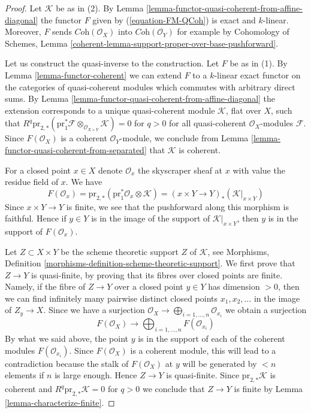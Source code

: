 \begin{proof}
Let $\mathcal{K}$ be as in (2). By
Lemma \ref{lemma-functor-quasi-coherent-from-affine-diagonal}
the functor $F$ given by (\ref{equation-FM-QCoh}) is exact and $k$-linear.
Moreover, $F$ sends $\textit{Coh}(\mathcal{O}_X)$ into
$\textit{Coh}(\mathcal{O}_Y)$ for example by
Cohomology of Schemes, Lemma
\ref{coherent-lemma-support-proper-over-base-pushforward}.

\medskip\noindent
Let us construct the quasi-inverse to the construction. Let $F$ be
as in (1). By Lemma \ref{lemma-functor-coherent} we can extend $F$
to a $k$-linear exact functor on the
categories of quasi-coherent modules which commutes with arbitrary direct sums.
By Lemma \ref{lemma-functor-quasi-coherent-from-affine-diagonal}
the extension corresponds to a unique quasi-coherent module
$\mathcal{K}$, flat over $X$, such that
$R^q\text{pr}_{2, *}(\text{pr}_1^*\mathcal{F}
\otimes_{\mathcal{O}_{X \times Y}} \mathcal{K}) = 0$ for $q > 0$
for all quasi-coherent $\mathcal{O}_X$-modules $\mathcal{F}$.
Since $F(\mathcal{O}_X)$ is a coherent $\mathcal{O}_Y$-module, we
conclude from Lemma \ref{lemma-functor-quasi-coherent-from-separated}
that $\mathcal{K}$ is coherent.

\medskip\noindent
For a closed point $x \in X$ denote $\mathcal{O}_x$ the skyscraper sheaf
at $x$ with value the residue field of $x$. We have
$$
F(\mathcal{O}_x) =
\text{pr}_{2, *}(\text{pr}_1^*\mathcal{O}_x \otimes \mathcal{K}) =
(x \times Y \to Y)_*(\mathcal{K}|_{x \times Y})
$$
Since $x \times Y \to Y$ is finite, we see that the pushforward along
this morphism is faithful. Hence if $y \in Y$ is in the image of the
support of $\mathcal{K}|_{x \times Y}$, then $y$ is in the support of
$F(\mathcal{O}_x)$.

\medskip\noindent
Let $Z \subset X \times Y$ be the scheme theoretic support $Z$ of
$\mathcal{K}$, see
Morphisms, Definition \ref{morphisms-definition-scheme-theoretic-support}.
We first prove that $Z \to Y$ is quasi-finite, by proving that its fibres
over closed points are finite. Namely, if the fibre of $Z \to Y$ over a
closed point $y \in Y$ has dimension $> 0$, then we can find infinitely
many pairwise distinct closed points $x_1, x_2, \ldots$ in the image of
$Z_y \to X$. Since we have a surjection
$\mathcal{O}_X \to \bigoplus_{i = 1, \ldots, n} \mathcal{O}_{x_i}$
we obtain a surjection
$$
F(\mathcal{O}_X) \to \bigoplus\nolimits_{i = 1, \ldots, n} F(\mathcal{O}_{x_i})
$$
By what we said above, the point $y$ is in the support of each
of the coherent modules $F(\mathcal{O}_{x_i})$. Since $F(\mathcal{O}_X)$
is a coherent module, this will lead to a contradiction because
the stalk of $F(\mathcal{O}_X)$ at $y$ will be generated by $< n$ elements
if $n$ is large enough. Hence $Z \to Y$ is quasi-finite.
Since $\text{pr}_{2, *}\mathcal{K}$ is coherent and
$R^q\text{pr}_{2, *}\mathcal{K} = 0$ for $q > 0$ we conclude
that $Z \to Y$ is finite by Lemma \ref{lemma-characterize-finite}.
\end{proof}


